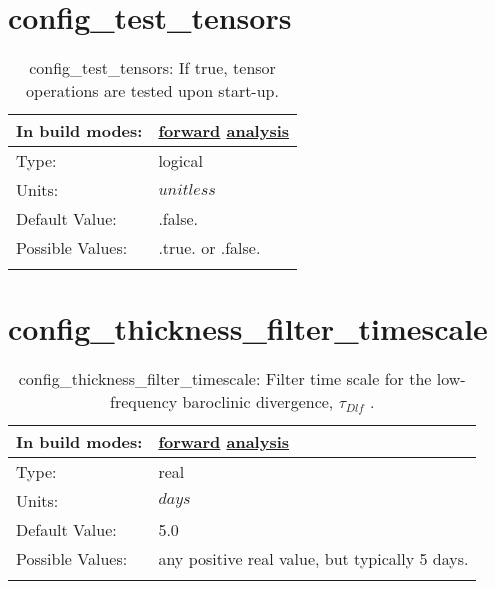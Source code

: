 \section[config\_test\_tensors]{config\_test\_tensors}
\label{sec:nm_sec_config_test_tensors}
\begin{center}
\begin{longtable}{| p{2.0in} || p{4.0in} |}
    \hline
    In build modes: & \hyperref[subsec:forward_nm_tab_testing]{forward} \hyperref[subsec:analysis_nm_tab_testing]{analysis} \\
    \hline
    Type: & logical \\
    \hline
    Units: & $unitless$ \\
    \hline
    Default Value: & .false. \\
    \hline
    Possible Values: & .true. or .false. \\
    \hline
    \caption{config\_test\_tensors: If true, tensor operations are tested upon start-up.}
\end{longtable}
\end{center}
\section[config\_thickness\_filter\_timescale]{config\_thickness\_filter\_timescale}
\label{sec:nm_sec_config_thickness_filter_timescale}
\begin{center}
\begin{longtable}{| p{2.0in} || p{4.0in} |}
    \hline
    In build modes: & \hyperref[subsec:forward_nm_tab_ALE_frequency_filtered_thickness]{forward} \hyperref[subsec:analysis_nm_tab_ALE_frequency_filtered_thickness]{analysis} \\
    \hline
    Type: & real \\
    \hline
    Units: & $days$ \\
    \hline
    Default Value: & 5.0 \\
    \hline
    Possible Values: & any positive real value, but typically 5 days. \\
    \hline
    \caption{config\_thickness\_filter\_timescale:  Filter time scale for the low-frequency baroclinic divergence,  $\tau_{Dlf}$ .}
\end{longtable}
\end{center}
